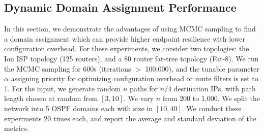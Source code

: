 \begin{figure}
	\centering
\end{figure}
\begin{figure}
	\centering
\end{figure}


\subsection{Dynamic Domain Assignment Performance} \label{sec:mcmceval}
In this section, we demonstrate the advantages of using MCMC sampling
to find a domain assignment which can provide higher endpoint
resilience with lower configuration overhead. For these experiments,
we consider two topologies: the Ion ISP topology (125 routers), and a
80 router fat-tree topology (Fat-8). We run the MCMC sampling for 600s
(iterations $>$ 100,000), and the tunable parameter $\alpha$ assigning
priority for optimizing configuration overhead or route filters is set
to 1. For the input, we generate random $n$ paths for $n/4$
destination IPs, with path length chosen at random from $[3,10]$. 
We vary $n$ from 200 to 1,000.
We
split the network into 5 OSPF domains each with size in $[10,40]$. We
conduct these experiments 20 times each, and report the average and
standard deviation of the metrics.

